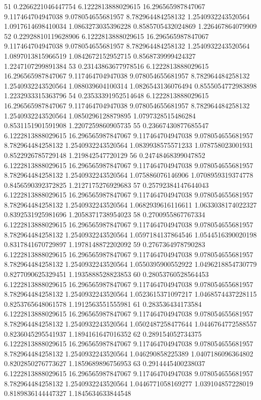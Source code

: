 {51 0.2266221046447754 6.1222813888029615 16.296565987847067 9.117464704947038 9.078054655681957 8.782964484258132 1.2540932243520564 1.0917614698410034 1.0863273035396228 0.8585705432024869 1.226467864079909
52 0.22928810119628906 6.1222813888029615 16.296565987847067 9.117464704947038 9.078054655681957 8.782964484258132 1.2540932243520564 1.0897013815966519 1.0842672152952715 0.8568739999424327 1.2247107299891384
53 0.23143863677978516 6.1222813888029615 16.296565987847067 9.117464704947038 9.078054655681957 8.782964484258132 1.2540932243520564 1.088039604100314 1.0826543136076494 0.8555054772983898 1.2232933315363796
54 0.23533391952514648 6.1222813888029615 16.296565987847067 9.117464704947038 9.078054655681957 8.782964484258132 1.2540932243520564 1.0850296128879895 1.0797328515486284 0.8531151901591908 1.2207259860905735
55 0.23667430877685547 6.1222813888029615 16.296565987847067 9.117464704947038 9.078054655681957 8.782964484258132 1.2540932243520564 1.0839938575571233 1.078758023001931 0.8522926785729148 1.219842547720129
56 0.24748468399047852 6.1222813888029615 16.296565987847067 9.117464704947038 9.078054655681957 8.782964484258132 1.2540932243520564 1.075886076146906 1.0708959319374778 0.8456590392372825 1.2127175276929683
57 0.25792384147644043 6.1222813888029615 16.296565987847067 9.117464704947038 9.078054655681957 8.782964484258132 1.2540932243520564 1.0682939616116611 1.0633038174022327 0.8392531925981696 1.2058371738954023
58 0.2700955867767334 6.1222813888029615 16.296565987847067 9.117464704947038 9.078054655681957 8.782964484258132 1.2540932243520564 1.0597184137864546 1.0544516390020198 0.8317841670729897 1.1978148872202092
59 0.2767364978790283 6.1222813888029615 16.296565987847067 9.117464704947038 9.078054655681957 8.782964484258132 1.2540932243520564 1.0550395900552922 1.0496218854730779 0.8277090625329451 1.1935888528823853
60 0.28053760528564453 6.1222813888029615 16.296565987847067 9.117464704947038 9.078054655681957 8.782964484258132 1.2540932243520564 1.0523615371097217 1.0468574437228115 0.8253765648061578 1.1912563551555981
61 0.283536434173584 6.1222813888029615 16.296565987847067 9.117464704947038 9.078054655681957 8.782964484258132 1.2540932243520564 1.0502487258477644 1.0446764772588557 0.8236045295541937 1.1894161647016352
62 0.289154052734375 6.1222813888029615 16.296565987847067 9.117464704947038 9.078054655681957 8.782964484258132 1.2540932243520564 1.046290858225389 1.0407186096364802 0.8202850276773627 1.1859689896756953
63 0.2914445400238037 6.1222813888029615 16.296565987847067 9.117464704947038 9.078054655681957 8.782964484258132 1.2540932243520564 1.0446771058169277 1.039104857228019 0.8189836144447327 1.1845634633844548
}
